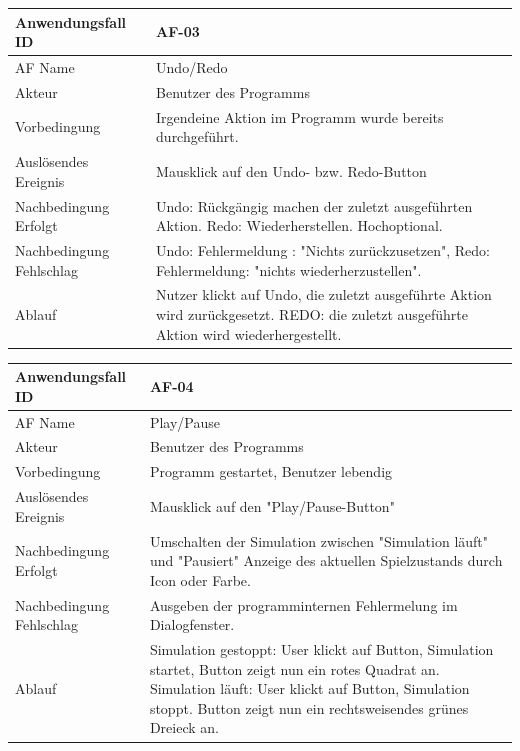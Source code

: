 \documentclass[11pt,a4paper]{article}
\begin{document}
\begin{tabular}[m]{|m{7cm}|m{9cm}|}
    \hline
    Anwendungsfall ID     & AF-03  \\
         \hline
    AF Name     &  Undo/Redo \\
         \hline
    Akteur&Benutzer des Programms \\
    \hline
    Vorbedingung&Irgendeine Aktion im Programm wurde bereits durchgeführt.\\
    \hline
    Auslösendes Ereignis&Mausklick auf den Undo- bzw. Redo-Button\\
    \hline
    Nachbedingung Erfolgt&Undo: Rückgängig machen der zuletzt ausgeführten Aktion. Redo: Wiederherstellen. Hochoptional.\\
    \hline
    Nachbedingung Fehlschlag&Undo: Fehlermeldung : "Nichts zurückzusetzen", Redo: Fehlermeldung: "nichts wiederherzustellen".\\
    \hline
    Ablauf&Nutzer klickt auf Undo, die zuletzt ausgeführte Aktion wird zurückgesetzt. REDO: die zuletzt ausgeführte Aktion wird wiederhergestellt.\\
    \hline
\end{tabular}
\par


\begin{tabular}[m]{|m{7cm}|m{9cm}|}
    \hline
    Anwendungsfall ID     & AF-04 \\
         \hline
    AF Name     &  Play/Pause \\
         \hline
    Akteur&Benutzer des Programms \\
    \hline
    Vorbedingung&Programm gestartet, Benutzer lebendig\\
    \hline
    Auslösendes Ereignis&Mausklick auf den "Play/Pause-Button"\\
    \hline
    Nachbedingung Erfolgt&Umschalten der Simulation zwischen "Simulation läuft" und "Pausiert" Anzeige des aktuellen Spielzustands durch Icon oder Farbe.\\
    \hline
    Nachbedingung Fehlschlag&Ausgeben der programminternen Fehlermelung im Dialogfenster.\\
    \hline
    Ablauf&Simulation gestoppt: User klickt auf Button, Simulation startet, Button zeigt nun ein rotes Quadrat an. Simulation läuft: User klickt auf Button, Simulation stoppt. Button zeigt nun ein rechtsweisendes grünes Dreieck an.\\
    \hline
\end{tabular}
\par
\end{document}
